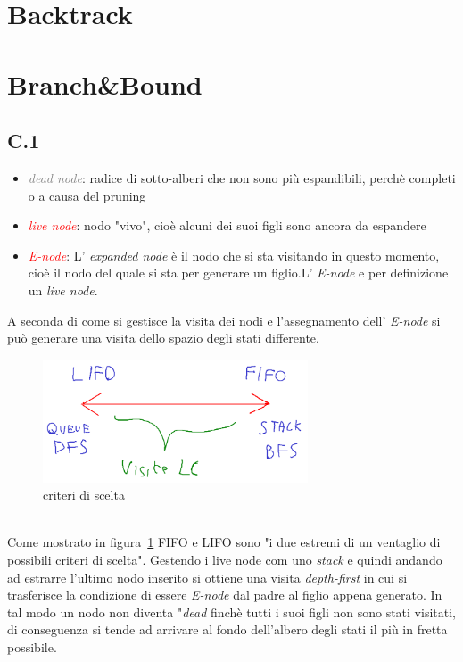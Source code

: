 \documentclass[a4paper]{article}
\begin{document}
\section{Backtrack}
\section{Branch\&Bound}
\subsection{C.1}
\label{SEC:C_1}
\begin{itemize}
	\item \textcolor{gray}{\textit{dead node}}: radice di sotto-alberi che non sono più espandibili, perchè completi o a causa del pruning
		\item \textcolor{red}{\textit{live node}}: nodo "vivo", cioè alcuni dei suoi figli sono ancora da espandere
		\item \textcolor{red}{\textit{E-node}}: L' \textit{expanded node} è il nodo che si sta visitando in questo momento, cioè il nodo del quale si sta per generare un figlio.L' \textit{E-node} e per definizione un \textit{live node}.
\end{itemize}
A seconda di come si gestisce la visita dei nodi e l'assegnamento dell' \textit{E-node} si può generare una visita dello spazio degli stati differente.
\begin{figure}[!ht]
\centering
\includegraphics[width=0.7\textwidth]{./img/C_1.png}
\caption{criteri di scelta} \label{FIG:C_1}
\end{figure}\\
Come mostrato in figura~\ref{FIG:C_1} FIFO e LIFO sono "i due estremi di un ventaglio di possibili criteri di scelta".
Gestendo i live node com uno \emph{stack} e quindi andando ad estrarre l'ultimo nodo inserito si ottiene una visita \textit{depth-first} in cui si trasferisce la condizione di essere \textit{E-node} dal padre al figlio appena generato.
In tal modo un nodo non diventa "\emph{dead} finchè tutti i suoi figli non sono stati visitati, di conseguenza si tende ad arrivare al fondo dell'albero degli stati il più in fretta possibile.
\end{document}
